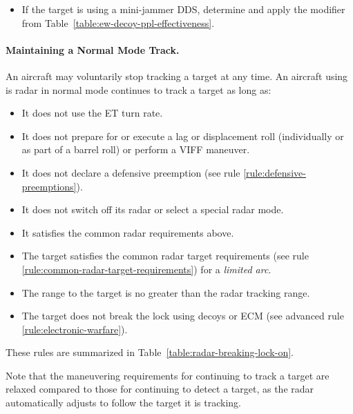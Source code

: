 {\begin{itemize}
    \item If the target is using a mini-jammer DDS, determine and apply the modifier from Table~\ref{table:ew-decoy-ppl-effectiveness}.

\end{itemize}

\paragraph{Maintaining a Normal Mode Track.} An aircraft may voluntarily stop tracking a target at any time.
An aircraft using is radar in normal mode continues to track a target as long as:
\begin{itemize}
\item It does not use the ET turn rate.
\item It does not prepare for or execute a lag or displacement roll (individually or as part of a barrel roll) or perform a VIFF maneuver.
\item It does not declare a defensive preemption (see rule \ref{rule:defensive-preemptions}).
\item It does not switch off its radar or select a special radar mode.
\item It satisfies the common radar requirements above.
\item The target satisfies the common radar target requirements (see rule \ref{rule:common-radar-target-requirements}) for a \emph{limited arc}.
\item The range to the target is no greater than the radar tracking range.
\item The target does not break the lock using decoys or ECM (see advanced rule \ref{rule:electronic-warfare}).
\end{itemize}

These rules are summarized in Table~\ref{table:radar-breaking-lock-on}. 

Note that the maneuvering requirements for continuing to track a target are relaxed compared to those for continuing to detect a target, as the radar automatically adjusts to follow the target it is tracking.

}

